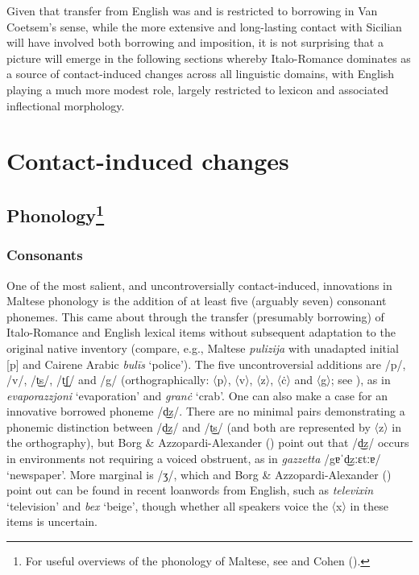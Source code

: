 \documentclass[output=paper]{langsci/langscibook}
\begin{document}
Given that transfer from English was and is restricted to borrowing in Van Coetsem's sense, while the more extensive and long-lasting contact with Sicilian will have involved both borrowing and imposition, it is not surprising that a picture will emerge in the following sections whereby Italo-Romance dominates as a source of contact-induced changes across all linguistic domains, with English playing a much more modest role, largely restricted to lexicon and associated inflectional morphology.

\section{Contact-induced changes
}
\subsection{Phonology\footnote{\textnormal{For useful overviews of the phonology of Maltese, see \cite{Borg1997Maltese} and Cohen (\citeyear{cohen1966,Cohen1970}).}}}
\subsubsection{Consonants} %
\label{sec:311}%
One of the most salient, and uncontroversially contact-induced, innovations in Maltese phonology is the addition of at least five (arguably seven) consonant phonemes. This came about through the transfer (presumably borrowing) of Italo-Romance and English lexical items without subsequent adaptation to the original native inventory (compare, e.g., Maltese \textit{pulizija} with unadapted initial [p] and Cairene Arabic \textit{bul\={i}s} `police'). The five uncontroversial additions are /p/, /v/, /t͜s/, /t͜ʃ/ and /g/ (orthographically: 〈p〉, 〈v〉, 〈z〉, 〈ċ〉 and 〈g〉; see ), as in \textit{evaporazzjoni} `evaporation' and \textit{granċ} `crab'. One can also make a case for an innovative borrowed phoneme /d͜z/. There are no minimal pairs demonstrating a phonemic distinction between /d͜z/ and /t͜s/ (and both are represented by 〈z〉 in the orthography), but Borg \& Azzopardi-Alexander (\citeyear[301]{BorgAzzopardi-Alexander1997}) point out that /d͜z/ occurs in environments not requiring a voiced obstruent, as in \textit{gazzetta} /gɐˈd͜zːɛtːɐ/ `newspaper'. More marginal is /ʒ/, which \citet{mifsud2011} and Borg \& Azzopardi-Alexander (\citeyear[303]{BorgAzzopardi-Alexander1997}) point out can be found in recent loanwords from English, such as \textit{televixin} `television' and \textit{bex} `beige', though whether all speakers voice the 〈x〉 in these items is uncertain.
\end{document}
